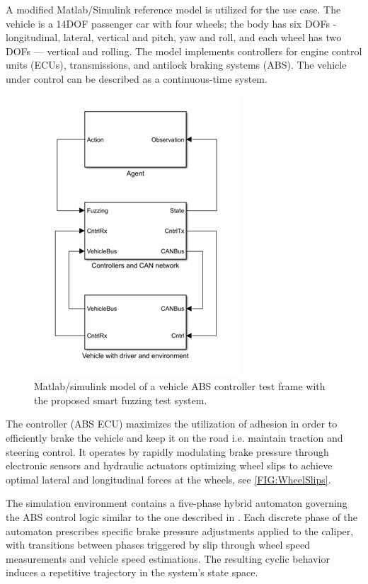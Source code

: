 \documentclass[a4paper, fleqn]{template/cas-dc}
\begin{document}
	A modified Matlab/Simulink reference model is utilized for the use case. The vehicle is a 14DOF passenger car with four wheels; the body has six DOFs - longitudinal, lateral, vertical and pitch, yaw and roll, and each wheel has two DOFs — vertical and rolling. The model implements controllers for engine control units (ECUs), transmissions, and antilock braking systems (ABS). The vehicle under control can be described as a continuous-time system. 
	
	\begin{figure}[h]
		\centering
		\includegraphics[width=.6\columnwidth]{figures/actualmodel.jpg}
		\caption{Matlab/simulink model of a vehicle ABS controller test frame with the proposed smart fuzzing test system.}
		\label{FIG:ABS_Simulink}
	\end{figure}
	
		
	The controller (ABS ECU) maximizes the utilization of adhesion in order to efficiently brake the vehicle and keep it on the road i.e. maintain traction and steering control. It operates by rapidly modulating brake pressure through electronic sensors and hydraulic actuators optimizing wheel slips to achieve optimal lateral and longitudinal forces at the wheels, see \autoref{FIG:WheelSlips}. 
	
	The simulation environment contains a five-phase hybrid automaton governing the ABS control logic similar to the one described in \cite{gerard2012improvements}. Each discrete phase of the automaton prescribes specific brake pressure adjustments applied to the caliper, with transitions between phases triggered by slip through wheel speed measurements and vehicle speed estimations. The resulting cyclic behavior induces a repetitive trajectory in the system’s state space.
	
\end{document}
